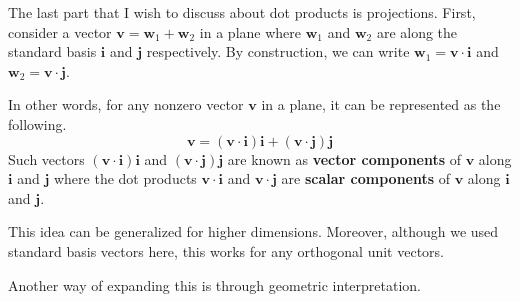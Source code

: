 \documentclass[../../main.tex]{subfiles}
\begin{document}
The last part that I wish to discuss about dot products is
projections. First, consider a vector $\mathbf{v} = \mathbf{w}_1
+ \mathbf{w}_2$ in a plane where $\mathbf{w}_1$ and $\mathbf{w}_2$ are
along the standard basis $\mathbf{i}$ and $\mathbf{j}$ respectively.
By construction, we can write $\mathbf{w}_1 = \mathbf{v} \cdot
\mathbf{i}$ and $\mathbf{w}_2 = \mathbf{v} \cdot \mathbf{j}$.

\begin{important}
In other words, for any nonzero vector $\mathbf{v}$ in a plane,
it can be represented as the following.
\[
\mathbf{v}
= (\mathbf{v} \cdot \mathbf{i}) \mathbf{i} +
    (\mathbf{v} \cdot \mathbf{j}) \mathbf{j}
\]
Such vectors $(\mathbf{v} \cdot \mathbf{i}) \mathbf{i}$ and
$(\mathbf{v} \cdot \mathbf{j}) \mathbf{j}$ are known as
\textbf{vector components} of $\mathbf{v}$ along $\mathbf{i}$ and
$\mathbf{j}$ where the dot products $\mathbf{v} \cdot \mathbf{i}$ and
$\mathbf{v} \cdot \mathbf{j}$ are \textbf{scalar components} of
$\mathbf{v}$ along $\mathbf{i}$ and $\mathbf{j}$.
\end{important}

This idea can be generalized for higher dimensions. Moreover,
although we used standard basis vectors here, this works for any
orthogonal unit vectors.

Another way of expanding this is through geometric interpretation.
\end{document}
